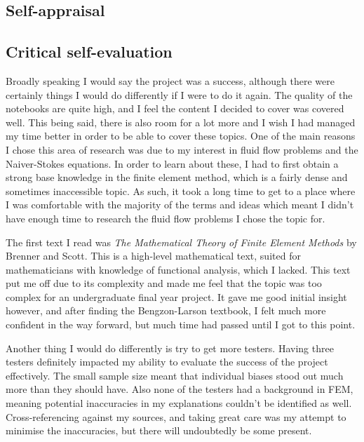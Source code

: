 \begin{appendices}

%
%
\chapter{Self-appraisal}


\section{Critical self-evaluation}

Broadly speaking I would say the project was a success, although there were certainly things I would do differently if I were to do it again. The quality of the notebooks are quite high, and I feel the content I decided to cover was covered well. This being said, there is also room for a lot more and I wish I had managed my time better in order to be able to cover these topics. One of the main reasons I chose this area of research was due to my interest in fluid flow problems and the Naiver-Stokes equations. In order to learn about these, I had to first obtain a strong base knowledge in the finite element method, which is a fairly dense and sometimes inaccessible topic. As such, it took a long time to get to a place where I was comfortable with the majority of the terms and ideas which meant I didn't have enough time to research the fluid flow problems I chose the topic for.

The first text I read was {\em The Mathematical Theory of Finite Element Methods} by Brenner and Scott. This is a high-level mathematical text, suited for mathematicians with knowledge of functional analysis, which I lacked. This text put me off due to its complexity and made me feel that the topic was too complex for an undergraduate final year project. It gave me good initial insight however, and after finding the Bengzon-Larson textbook, I felt much more confident in the way forward, but much time had passed until I got to this point.

Another thing I would do differently is try to get more testers. Having three testers definitely impacted my ability to evaluate the success of the project effectively. The small sample size meant that individual biases stood out much more than they should have. Also none of the testers had a background in FEM, meaning potential inaccuracies in my explanations couldn't be identified as well. Cross-referencing against my sources, and taking great care was my attempt to minimise the inaccuracies, but there will undoubtedly be some present.


\end{appendices}
